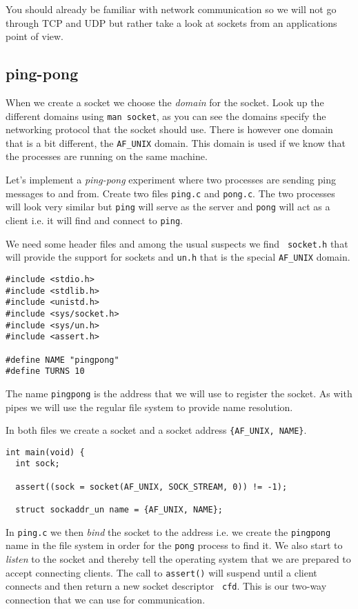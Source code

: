 \documentclass[a4paper,11pt]{article}
\begin{document}
You should already be familiar with network communication so we will
not go through TCP and UDP but rather take a look at sockets from an
applications point of view.

\subsection{ping-pong}

When we create a socket we choose the {\em domain} for the
socket. Look up the different domains using {\tt man socket}, as you
can see the domains specify the networking protocol that the socket
should use. There is however one domain that is a bit different, the
{\tt AF\_UNIX} domain. This domain is used if we know that the
processes are running on the same machine. 

Let's implement a {\em ping-pong} experiment where two processes are
sending ping messages to and from. Create two files {\tt ping.c} and
{\tt pong.c}. The two processes will look very similar but {\tt ping}
will serve as the server and {\tt pong} will act as a client i.e. it
will find and connect to {\tt ping}.

We need some header files and among the usual suspects we find {\tt
  socket.h} that will provide the support for sockets and {\tt un.h}
that is the special {\tt AF\_UNIX} domain. 

\begin{lstlisting}
#include <stdio.h>
#include <stdlib.h>
#include <unistd.h>
#include <sys/socket.h>
#include <sys/un.h>
#include <assert.h>

#define NAME "pingpong"
#define TURNS 10
\end{lstlisting}

The name {\tt pingpong} is the address that we will use to register
the socket. As with pipes we will use the regular file system to
provide name resolution.

In both files we create a socket and a socket address {\tt \{AF\_UNIX,
  NAME\}}.

\begin{lstlisting}
int main(void) {
  int sock;

  assert((sock = socket(AF_UNIX, SOCK_STREAM, 0)) != -1);

  struct sockaddr_un name = {AF_UNIX, NAME};  
\end{lstlisting}

In {\tt ping.c} we then {\em bind} the socket to the address i.e. we
create the {\tt pingpong} name in the file system in order for the
{\tt pong} process to find it. We also start to {\em listen} to the
socket and thereby tell the operating system that we are prepared to
accept connecting clients. The call to {\tt assert()} will suspend
until a client connects and then return a new socket descriptor {\tt
  cfd}. This is our two-way connection that we can use for
communication. 
\end{document}
